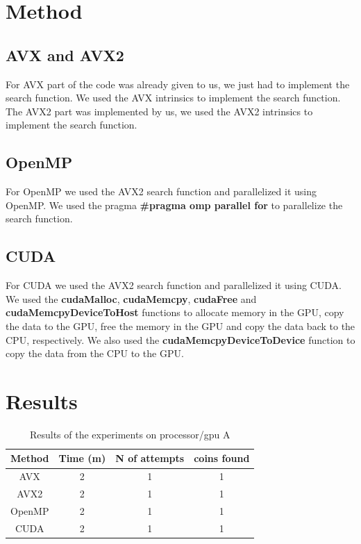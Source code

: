 \documentclass[a4paper,12pt]{article}
\begin{document}
\section{Method}
\label{sec:method}
\subsection{AVX and AVX2}
\label{subsec:avx}

For AVX part of the code was already given to us, we just had to implement the search function. We used the AVX intrinsics to implement the search function. The AVX2 part was implemented by us, we used the AVX2 intrinsics to implement the search function.


\subsection{OpenMP}
\label{subsec:openmp}

For OpenMP we used the AVX2 search function and parallelized it using OpenMP. We used the pragma \textbf{\#pragma omp parallel for} to parallelize the search function.

\subsection{CUDA}
\label{subsec:cuda}

For CUDA we used the AVX2 search function and parallelized it using CUDA. We used the \textbf{cudaMalloc}, \textbf{cudaMemcpy}, \textbf{cudaFree} and \textbf{cudaMemcpyDeviceToHost} functions to allocate memory in the GPU, copy the data to the GPU, free the memory in the GPU and copy the data back to the CPU, respectively. We also used the \textbf{cudaMemcpyDeviceToDevice} function to copy the data from the CPU to the GPU.


\section{Results}
\label{sec:results}

\begin{table}[h]
    \centering
    \begin{tabular}{|c|c|c|c|}
        \hline
        \textbf{Method} & \textbf{Time (m)} & \textbf{N of attempts} & \textbf{coins found} \\
        \hline
        AVX & 2 & 1 & 1  \\
        AVX2 & 2 & 1 & 1 \\
        OpenMP & 2 & 1 & 1 \\
        CUDA & 2 & 1 & 1  \\
        \hline
    \end{tabular}
    \caption{Results of the experiments on processor/gpu A}
    \label{tab:results}
\end{table}
\end{document}
